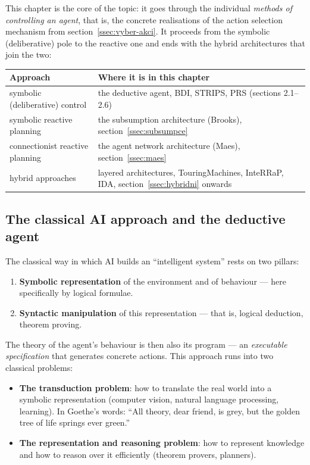 \documentclass[11pt,a4paper]{article}
\theoremstyle{definition}
\providecommand{\uv}[1]{``#1''}
\begin{document}
This chapter is the core of the topic: it goes through the individual \emph{methods of
controlling an agent}, that is, the concrete realisations of the action selection mechanism from
section~\ref{ssec:vyber-akci}. It proceeds from the symbolic (deliberative) pole to the reactive
one and ends with the hybrid architectures that join the two:

\begin{center}
\small
\begin{tabular}{@{}p{} p{}@{}}
\toprule
\textbf{Approach} & \textbf{Where it is in this chapter} \\
\midrule
symbolic (deliberative) control
  & the deductive agent, BDI, STRIPS, PRS (sections 2.1--2.6) \\
symbolic reactive planning
  & the subsumption architecture (Brooks), section~\ref{ssec:subsumpce} \\
connectionist reactive planning
  & the agent network architecture (Maes), section~\ref{ssec:maes} \\
hybrid approaches
  & layered architectures, TouringMachines, InteRRaP, IDA, section~\ref{ssec:hybridni} onwards \\
\bottomrule
\end{tabular}
\end{center}
\subsection{The classical AI approach and the deductive agent}

The classical way in which AI builds an \uv{intelligent system} rests on two pillars:
\begin{enumerate}
\item \textbf{Symbolic representation} of the environment and of behaviour --- here specifically by
  logical formulae.
\item \textbf{Syntactic manipulation} of this representation --- that is, logical deduction,
  theorem proving.
\end{enumerate}
The theory of the agent's behaviour is then also its program --- an \emph{executable specification}
that generates concrete actions. This approach runs into two classical problems:
\begin{itemize}
\item \textbf{The transduction problem}: how to translate the real world into a symbolic
  representation (computer vision, natural language processing, learning).
  In Goethe's words: \uv{All theory, dear friend, is grey, but the golden tree of life springs ever
  green.}
\item \textbf{The representation and reasoning problem}: how to represent knowledge and how to
  reason over it efficiently (theorem provers, planners).
\end{itemize}
\end{document}
